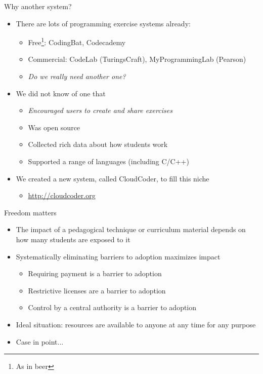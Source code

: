 \documentclass{beamer}
\begin{document}
\begin{frame}{Why another system?}

\begin{itemize}
  \item There are lots of programming exercise systems already:
  \begin{itemize}
    \item Free\footnote{As in beer}: CodingBat, Codecademy
    \item Commercial: CodeLab (TuringsCraft), MyProgrammingLab (Pearson)
    \item {\em Do we really need another one?}
  \end{itemize}
  \item We did not know of one that
  \begin{itemize}
    \item {\em Encouraged users to create and share exercises}
    \item Was open source
    \item Collected rich data about how students work
    \item Supported a range of languages (including C/C++)
  \end{itemize}
  \item We created a new system, called CloudCoder, to fill this niche
    \begin{itemize}
    \item \url{http://cloudcoder.org}
    \end{itemize}
\end{itemize}

\end{frame}

\begin{frame}{Freedom matters}

\begin{itemize}
  \item The impact of a pedagogical technique or curriculum material
        depends on how many students are exposed to it
  \item Systematically eliminating barriers to adoption maximizes impact
  \begin{itemize}
    \item Requiring payment is a barrier to adoption
    \item Restrictive licenses are a barrier to adoption
    \item Control by a central authority is a barrier to adoption
  \end{itemize}
  \item Ideal situation: resources are available to anyone at any time for any purpose
  \item Case in point...
\end{itemize}

\end{frame}
\end{document}
